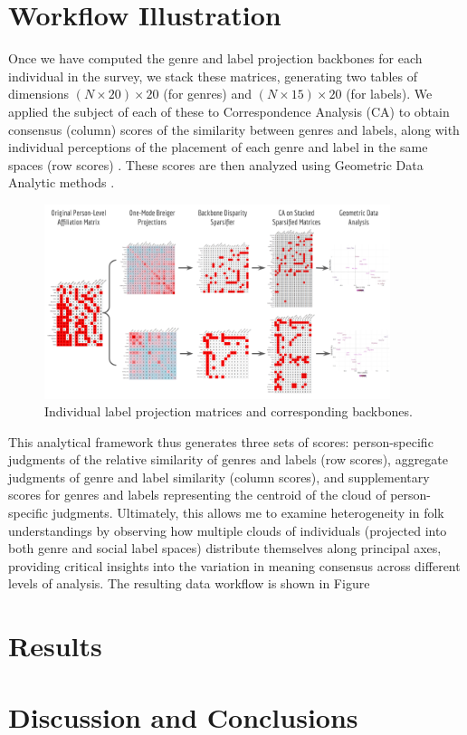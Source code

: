 \documentclass[12pt]{article}
\begin{document}
\section*{Workflow Illustration}
Once we have computed the genre and label projection backbones for each individual in the survey, we stack these matrices, generating two tables of dimensions $(N \times 20) \times 20$ (for genres) and $(N \times 15) \times 20$ (for labels). We applied the subject of each of these to Correspondence Analysis (CA) to obtain consensus (column) scores of the similarity between genres and labels, along with individual perceptions of the placement of each genre and label in the same spaces (row scores) \citep{kumbasar1994systematic-213}. These scores are then analyzed using Geometric Data Analytic methods \citep{rouanet2000geometric-a44}.

\begin{figure}[ht!]
    \captionsetup[subfigure]{font=footnotesize,labelfont=footnotesize}
    \centering
        \includegraphics[trim={1cm 0cm 0cm 0cm},clip, width=0.9\textwidth]{mondo-workflow.png}
    \caption{Individual label projection matrices and corresponding backbones.}
    \label{fig:ind-ex-cp}
\end{figure}


This analytical framework thus generates three sets of scores: person-specific judgments of the relative similarity of genres and labels (row scores), aggregate judgments of genre and label similarity (column scores), and supplementary scores for genres and labels representing the centroid of the cloud of person-specific judgments. Ultimately, this allows me to examine heterogeneity in folk understandings by observing how multiple clouds of individuals (projected into both genre and social label spaces) distribute themselves along principal axes, providing critical insights into the variation in meaning consensus across different levels of analysis. The resulting data workflow is shown in Figure


\section*{Results}

\section*{Discussion and Conclusions}

\newpage


\end{document}
